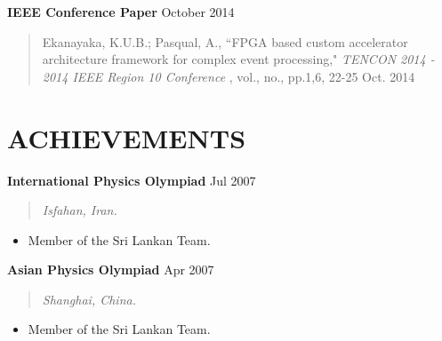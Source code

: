 \documentclass[mm]{res} %
\begin{document}
\begin{resume}
\textbf{IEEE Conference Paper } \hfill October 2014
\begin{quote}
Ekanayaka, K.U.B.; Pasqual, A., ``FPGA based custom accelerator architecture framework for complex event processing," \emph{TENCON 2014 - 2014 IEEE Region 10 Conference} , vol., no., pp.1,6, 22-25 Oct. 2014
\end{quote}
 

\section{ACHIEVEMENTS} 

\textbf{International Physics Olympiad} \hfill Jul 2007
\begin{quote}
\emph{Isfahan, Iran.}
\end{quote}

\begin{itemize} \itemsep -1pt %
\item Member of the Sri Lankan Team.
\end{itemize}

\textbf{Asian Physics Olympiad} \hfill Apr 2007
\begin{quote}
\emph{Shanghai, China.}
\end{quote}

\begin{itemize} \itemsep -1pt %
\item Member of the Sri Lankan Team.
\end{itemize}





\end{resume}
\end{document}

